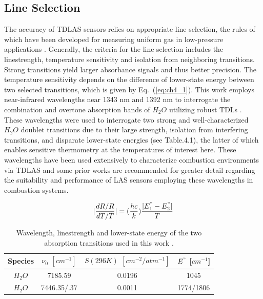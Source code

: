 \subsection{Line Selection}
The accuracy of TDLAS sensors relies on appropriate line selection, the rules of which have been developed for measuring uniform gas in low-pressure applications \cite{Zhou2005}. Generally, the criteria for the line selection includes the linestrength, temperature sensitivity and isolation from neighboring transitions. Strong transitions yield larger absorbance signals and thus better precision. The temperature sensitivity depends on the difference of lower-state energy between two selected transitions, which is given by Eq.\ (\ref{eq:ch4_1}). This work employs near-infrared wavelengths near 1343 nm and 1392 nm to interrogate the combination and overtone absorption bands of $H_2O$ utilizing robust TDLs \cite{FURLONG1998103}. These wavelengths were used to interrogate two strong and well-characterized $H_2O$ doublet transitions due to their large strength, isolation from interfering transitions, and disparate lower-state energies (see Table.4.1), the latter of which enables sensitive thermometry at the temperatures of interest here. These wavelengths have been used extensively to characterize combustion environments via TDLAS and some prior works \cite{Goldenstein:16,Goldenstein2014,rieker2009calibration,strand2015quantification} are recommended for greater detail regarding the suitability and performance of LAS sensors employing these wavelengths in combustion systems.


\begin{equation}\label{eq:ch4_1}
|\frac{dR/R}{dT/T}|=(\frac{hc}{k})\frac{|E_1^"-E_2^"|}{T}
\end{equation}

\begin{table}[h]
\begin{center}
\begin{tabular}{ c c c c }
\hline
Species & $\nu_0$ $[cm^{-1}]$ & $S(296 K)$ $[cm^{-2}/atm^{-1}]$ & $E^"$ [$cm^{-1}$]\\ \hline
$H_2O$ & 7185.59 & 0.0196 & 1045\\ 
$H_2O$ & 7446.35/.37 & 0.0011 & 1774/1806\\ \hline
\end{tabular}
\caption{Wavelength, linestrength and lower-state energy of the two absorption transitions used in this work \cite{Goldenstein:16}.}
\label{table:ch4_1}
\end{center}
\end{table}

